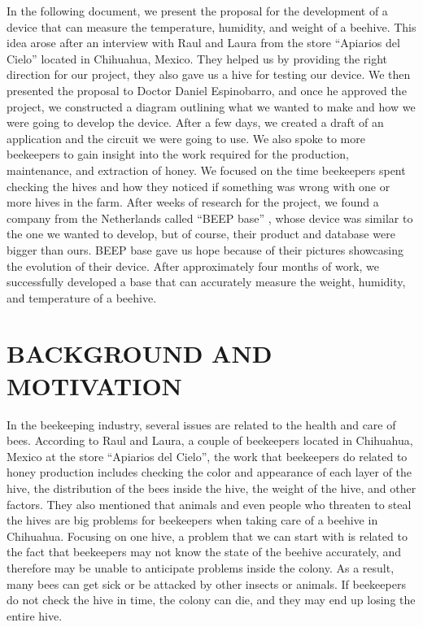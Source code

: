 \documentclass[12pt]{report}
\begin{document}
	In the following document, we present the proposal for the development of a device that can measure the temperature, humidity, and weight of a beehive. This idea arose after an interview with Raul and Laura from the store ``Apiarios del Cielo'' located in Chihuahua, Mexico. They helped us by providing the right direction for our project, they also gave us a hive for testing our device. We then presented the proposal to Doctor Daniel Espinobarro, and once he approved the project, we constructed a diagram outlining what we wanted to make and how we were going to develop the device. After a few days, we created a draft of an application and the circuit we were going to use. We also spoke to more beekeepers to gain insight into the work required for the production, maintenance, and extraction of honey. We focused on the time beekeepers spent checking the hives and how they noticed if something was wrong with one or more hives in the farm. After weeks of research for the project, we found a company from the Netherlands called ``BEEP base'' \cite{BEEP_base_website}, whose device was similar to the one we wanted to develop, but of course, their product and database were bigger than ours. BEEP base gave us hope because of their pictures showcasing the evolution of their device. After approximately four months of work, we successfully developed a base that can accurately measure the weight, humidity, and temperature of a beehive.
	
	
	\pagebreak
	
	\tableofcontents
	\thispagestyle{empty}
	\pagebreak
	
	\listoffigures
	\thispagestyle{empty}
	\pagebreak
	
	\listoftables
	\thispagestyle{empty}
	\pagebreak
	
	
	\setcounter{page}{1}
	
	
	\chapter{BACKGROUND AND MOTIVATION}
	In the beekeeping industry, several issues are related to the health and care of bees. According to Raul and Laura, a couple of beekeepers located in Chihuahua, Mexico at the store ``Apiarios del Cielo'', the work that beekeepers do related to honey production includes checking the color and appearance of each layer of the hive, the distribution of the bees inside the hive, the weight of the hive, and other factors. They also mentioned that animals and even people who threaten to steal the hives are big problems for beekeepers when taking care of a beehive in Chihuahua. Focusing on one hive, a problem that we can start with is related to the fact that beekeepers may not know the state of the beehive accurately, and therefore may be unable to anticipate problems inside the colony. As a result, many bees can get sick or be attacked by other insects or animals. If beekeepers do not check the hive in time, the colony can die, and they may end up losing the entire hive.
	
\end{document}
